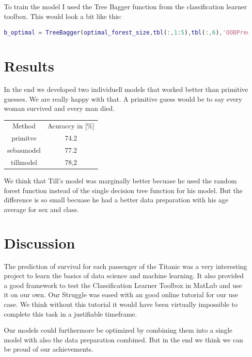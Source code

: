 \documentclass[
   10.5pt,
   invert-title=true,
   titlepage=false,
   titleimage-ratio=13,
   class=article
]{bfhpub}				%
\begin{document}
To train the model I used the Tree Bagger function from the classification learner toolbox. This would look a bit like this:
\begin{lstlisting}[language=Matlab]
b_optimal = TreeBagger(optimal_forest_size,tbl(:,1:5),tbl(:,6),'OOBPredictorImportance','off','OOBPrediction','on');
\end{lstlisting}


\section*{Results}
In the end we developed two individuell models that worked better than primitive guesses. We are really happy with that. A primitive guess would be to say every woman survived and every man died.

\begin{center}
	\begin{tabular}{ c c }
		Method & Acuraccy in [\%] \\
		primitve & 74.2 \\ 
		sebasmodel & 77.2 \\
		tillmodel & 78,2    
	\end{tabular}
\end{center}
We think that Till's model was marginally better becuase he used the random forest function instead of the single decision tree function for his model. But the difference is so small becuase he had a better data preparation with his age average for sex and class.

\section*{Discussion}
The prediction of survival for each passenger of the Titanic was a very interesting project to learn the basics of data science and machine learning. It also provided a good framework to test the Classification Learner Toolbox in MatLab and use it on our own. Our Struggle was eased with an good online tutorial for our use case. We think without this tutorial it would have been virtually impossible to complete this task in a justifiable timeframe.

Our models could furthermore be optimized by combining them into a single model with also the data preparation combined.
But in the end we think we can be proud of our achievements.



\end{document}
